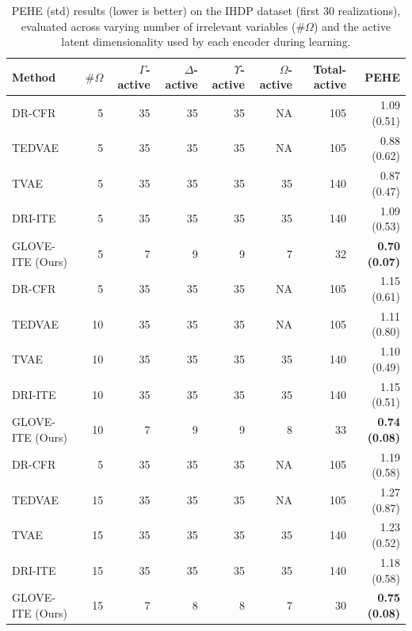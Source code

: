 \documentclass[doubleblind]{ecai}
\begin{document}
	\begin{table}[!ht]
		\centering
		\caption{PEHE (std) results (lower is better) on the IHDP dataset (first 30 realizations), evaluated across varying number of irrelevant variables ($\#\Omega$) and the active latent dimensionality used by each encoder during learning.}
		\begin{tabular}{lrrrrrrr}
			\toprule
			Method & $\#\Omega$ & $\Gamma$-active & $\Delta$-active & $\Upsilon$-active & $\Omega$-active & Total-active & PEHE \\
			\midrule
			
			DR-CFR		&5	& 35 & 35      & 35           & NA   & 105          & 	1.09 (0.51)							\\
			TEDVAE    	& 5          	& 35 & 35      & 35           & NA   & 105          & 0.88 (0.62)           \\
			TVAE   		& 5     		& 35 & 35      & 35           & 35   & 140          & 0.87 (0.47)        \\
			DRI-ITE     & 5         	& 35 & 35      & 35           & 35   & 140          & 1.09 (0.53)           \\
			GLOVE-ITE (Ours)    	& 5           	& 7 & 9      & 9           & 7   & 32          & \textbf{0.70 (0.07)}          \\
			
			\bottomrule
			DR-CFR		&5	& 35 & 35      & 35           & NA   & 105          & 		1.15 (0.61)						\\
			TEDVAE    	& 10          	& 35 & 35      & 35           & NA   & 105          & 1.11 (0.80)           \\
			TVAE   		& 10       	& 35 & 35      & 35           & 35   & 140          & 1.10 (0.49)        \\
			DRI-ITE     & 10        	& 35 & 35      & 35           & 35   & 140          & 1.15 (0.51)           \\
			GLOVE-ITE (Ours)    	& 10           & 7 & 9      & 9           &   8 & 33          & \textbf{0.74 (0.08)}          \\
			
			\bottomrule
			DR-CFR		&5	& 35 & 35      & 35           & NA   & 105          & 		1.19 (0.58)						\\
			TEDVAE    	& 15          	& 35 & 35      & 35           & NA   & 105          & 1.27 (0.87)           \\
			TVAE   		& 15      	& 35 & 35      & 35           & 35   & 140          & 1.23 (0.52)        \\
			DRI-ITE     & 15         	& 35 & 35      & 35           & 35   & 140          & 1.18 (0.58)           \\
			GLOVE-ITE (Ours)    	& 15           & 7 & 8      & 8           & 7   & 30          & \textbf{0.75 (0.08)}         \\
			

\end{tabular}
\end{table}
\end{document}
